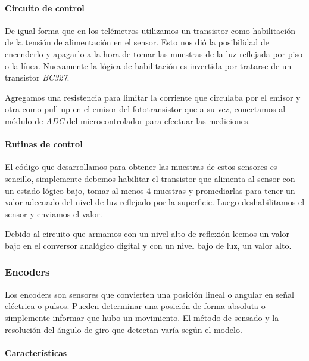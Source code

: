 \paragraph{Circuito de control}
\label{h_sensado_piso_circuito}

De igual forma que en los tel\'emetros utilizamos un transistor como habilitaci\'on de la tensi\'on de alimentaci\'on en el sensor.
Esto nos di\'o la posibilidad de encenderlo y apagarlo a la hora de tomar las muestras de la luz reflejada por piso o la l\'inea.
Nuevamente la l\'ogica de habilitaci\'on es invertida por tratarse de un transistor \emph{BC327}.

Agregamos una resistencia para limitar la corriente que circulaba por el emisor y otra como pull-up en el emisor del fototransistor
que a su vez, conectamos al m\'odulo de \emph{ADC} del microcontrolador para efectuar las mediciones.

\paragraph{Rutinas de control}
\label{h_sensado_piso_rutinas}

El c\'odigo que desarrollamos para obtener las muestras de estos sensores es sencillo, simplemente debemos habilitar el
transistor que alimenta al sensor con un estado l\'ogico bajo, tomar al menos $4$ muestras y promediarlas para tener un
valor adecuado del nivel de luz reflejado por la superficie.
Luego deshabilitamos el sensor y enviamos el valor.

Debido al circuito que armamos con un nivel alto de reflexi\'on leemos un valor bajo en el conversor anal\'ogico digital y
con un nivel bajo de luz, un valor alto.

\subsubsection{Encoders}
\label{h_sensado_encoder}

Los encoders son sensores que convierten una posici\'on lineal o angular en se\~nal el\'ectrica o pulsos.
Pueden determinar una posici\'on de forma absoluta o simplemente informar que hubo un movimiento.
El m\'etodo de sensado y la resoluci\'on del \'angulo de giro que detectan var\'ia seg\'un el modelo.

\paragraph{Caracter\'isticas}
\label{h_sensado_encoder_caracteristicas}

